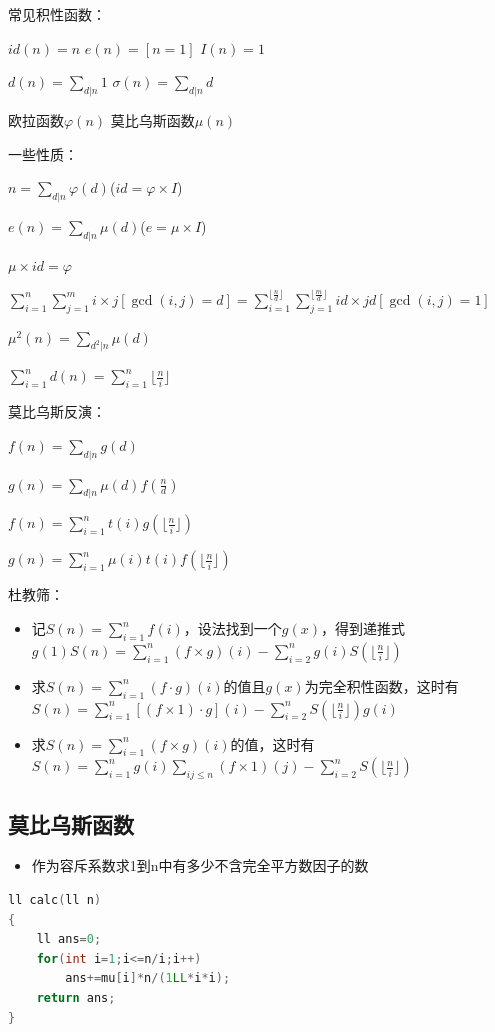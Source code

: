 \documentclass[UTF8,a4paper,titlepage]{ctexart}
\begin{document}
            常见积性函数：\par
            $id(n)=n$\qquad
       		$e(n)=[n=1]$\qquad
       		$I(n)=1$\par
            $d(n)=\sum_{d|n}1$\qquad
         	$\sigma(n)=\sum_{d|n}d$\par
         	欧拉函数$\varphi(n)$\qquad
         	莫比乌斯函数$\mu(n)$\par
            一些性质：\par
            $n=\sum_{d|n}\varphi(d)$\qquad($id=\varphi \times I$)\par
            $e(n)=\sum_{d|n}\mu(d)$\qquad($e=\mu \times I$)\par
            $\mu\times id=\varphi$\par
            $\sum_{i=1}^n\sum_{j=1}^m i\times j[\gcd(i,j)=d]=\sum_{i=1}^{\lfloor\frac{n}{d}\rfloor}\sum_{j=1}^{\lfloor\frac{m}{d}\rfloor} id\times jd[\gcd(i,j)=1]$\par
            $\mu^2(n)=\sum_{d^2|n}\mu(d)$\par
            $\sum_{i=1}^nd(n)=\sum_{i=1}^n\lfloor\frac{n}{i}\rfloor$\par
            莫比乌斯反演：\par
            $f(n)=\sum_{d|n}g(d)$\par
            $g(n)=\sum_{d|n}\mu(d)f(\frac{n}{d})$\par
            $f(n)=\sum_{i=1}^nt(i)g(\lfloor\frac{n}{i}\rfloor)$\par
            $g(n)=\sum_{i=1}^n\mu(i)t(i)f(\lfloor\frac{n}{i}\rfloor)$\par
           	杜教筛：\par
           	\begin{itemize}
           	\item 记$S(n)=\sum_{i=1}^{n}f(i)$，设法找到一个$g(x)$，得到递推式$g(1)S(n)=\sum_{i=1}^{n}(f\times g)(i)-\sum_{i=2}^{n}g(i)S(\lfloor\frac{n}{i}\rfloor)$
           	\item 求$S(n)=\sum_{i=1}^n (f \cdot g)(i)$的值且$g(x)$为完全积性函数，这时有$S(n)=\sum_{i=1}^n[(f\times 1) \cdot g](i)-\sum_{i=2}^n S(\lfloor \frac{n}{i} \rfloor)g(i)$
           	\item 求$S(n)=\sum_{i=1}^n (f\times g)(i)$的值，这时有
           	$S(n)=\sum_{i=1}^n g(i)\sum_{ij \leq n}(f\times 1)(j)-\sum_{i=2}^n S(\lfloor \frac{n}{i} \rfloor)$
           	\end{itemize}
           	
           	
\subsection{莫比乌斯函数}
\begin{itemize}
\item 作为容斥系数求1到n中有多少不含完全平方数因子的数
\end{itemize}
\begin{lstlisting}[language=C++]
ll calc(ll n)
{
    ll ans=0;
    for(int i=1;i<=n/i;i++)
        ans+=mu[i]*n/(1LL*i*i);
    return ans;
}
\end{lstlisting}
\end{document}
